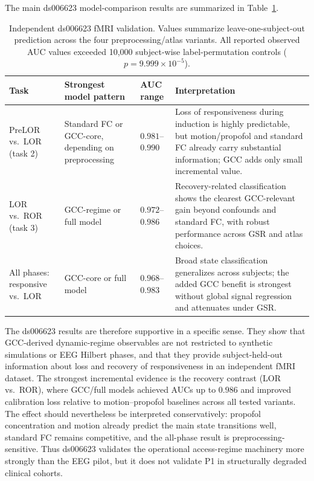 \documentclass[11pt,a4paper]{article}
\theoremstyle{plain}
\theoremstyle{definition}
\theoremstyle{remark}
\begin{document}
The main ds006623 model-comparison results are summarized in Table~\ref{tab:fmri-validation}.

\begin{table}[h]
\centering
\caption{Independent ds006623 fMRI validation. Values summarize leave-one-subject-out prediction across the four preprocessing/atlas variants. All reported observed AUC values exceeded 10,000 subject-wise label-permutation controls ($p = 9.999\times10^{-5}$).}
\label{tab:fmri-validation}
\small
\begin{tabular}{p{3.1cm}p{3.3cm}p{3.1cm}p{4.6cm}}
\hline
Task & Strongest model pattern & AUC range & Interpretation \\
\hline
PreLOR vs.\ LOR (task 2) & Standard FC or GCC-core, depending on preprocessing & $0.981$--$0.990$ & Loss of responsiveness during induction is highly predictable, but motion/propofol and standard FC already carry substantial information; GCC adds only small incremental value. \\
LOR vs.\ ROR (task 3) & GCC-regime or full model & $0.972$--$0.986$ & Recovery-related classification shows the clearest GCC-relevant gain beyond confounds and standard FC, with robust performance across GSR and atlas choices. \\
All phases: responsive vs.\ LOR & GCC-core or full model & $0.968$--$0.983$ & Broad state classification generalizes across subjects; the added GCC benefit is strongest without global signal regression and attenuates under GSR. \\
\hline
\end{tabular}
\end{table}

The ds006623 results are therefore supportive in a specific sense. They show that GCC-derived dynamic-regime observables are not restricted to synthetic simulations or EEG Hilbert phases, and that they provide subject-held-out information about loss and recovery of responsiveness in an independent fMRI dataset. The strongest incremental evidence is the recovery contrast (LOR vs.\ ROR), where GCC/full models achieved AUCs up to $0.986$ and improved calibration loss relative to motion--propofol baselines across all tested variants. The effect should nevertheless be interpreted conservatively: propofol concentration and motion already predict the main state transitions well, standard FC remains competitive, and the all-phase result is preprocessing-sensitive. Thus ds006623 validates the operational access-regime machinery more strongly than the EEG pilot, but it does not validate P1 in structurally degraded clinical cohorts.
\end{document}
